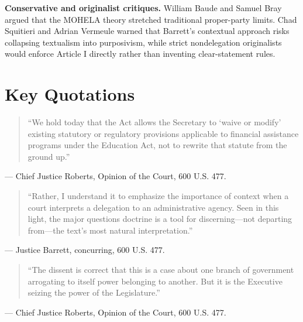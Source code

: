 \documentclass[12pt]{article}
\begin{document}
\textbf{Conservative and originalist critiques.} William Baude and Samuel Bray argued that the MOHELA theory stretched traditional proper-party limits. Chad Squitieri and Adrian Vermeule warned that Barrett's contextual approach risks collapsing textualism into purposivism, while strict nondelegation originalists would enforce Article I directly rather than inventing clear-statement rules.

\section{Key Quotations}

\begin{quote}
``We hold today that the Act allows the Secretary to `waive or modify' existing statutory or regulatory provisions applicable to financial assistance programs under the Education Act, not to rewrite that statute from the ground up.''
\end{quote}
\noindent --- Chief Justice Roberts, Opinion of the Court, 600 U.S. 477.

\begin{quote}
``Rather, I understand it to emphasize the importance of context when a court interprets a delegation to an administrative agency. Seen in this light, the major questions doctrine is a tool for discerning---not departing from---the text's most natural interpretation.''
\end{quote}
\noindent --- Justice Barrett, concurring, 600 U.S. 477.

\begin{quote}
``The dissent is correct that this is a case about one branch of government arrogating to itself power belonging to another. But it is the Executive seizing the power of the Legislature.''
\end{quote}
\noindent --- Chief Justice Roberts, Opinion of the Court, 600 U.S. 477.
\end{document}
